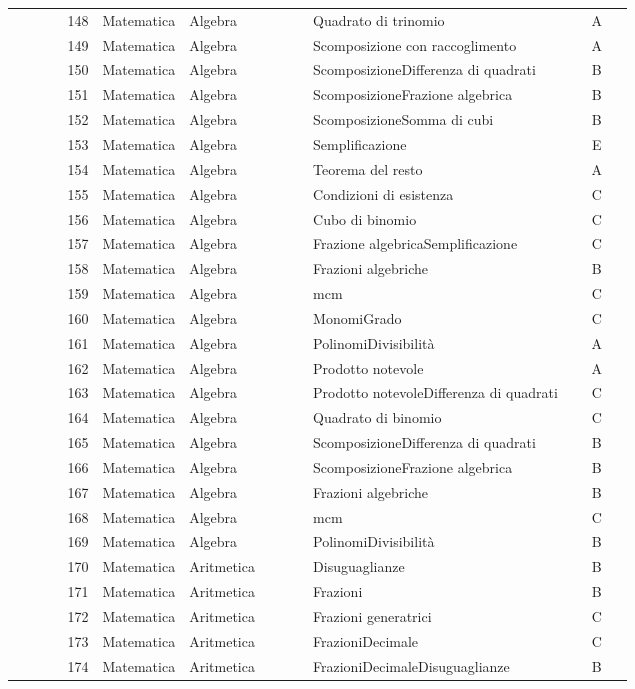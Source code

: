 \documentclass[20pt, a4paper]{article}
\begin{document}
\begin{longtable}{@{}r>{\raggedright\arraybackslash}p{0.14\linewidth}>{\raggedright\arraybackslash}p{0.20\linewidth}>{\raggedright\arraybackslash}p{0.42\linewidth}c@{}}
148 & Matematica & Algebra & Quadrato di trinomio & A \\
149 & Matematica & Algebra & Scomposizione con raccoglimento & A \\
150 & Matematica & Algebra & ScomposizioneDifferenza di quadrati & B \\
151 & Matematica & Algebra & ScomposizioneFrazione algebrica & B \\
152 & Matematica & Algebra & ScomposizioneSomma di cubi & B \\
153 & Matematica & Algebra & Semplificazione & E \\
154 & Matematica & Algebra & Teorema del resto & A \\
155 & Matematica & Algebra & Condizioni di esistenza & C \\
156 & Matematica & Algebra & Cubo di binomio & C \\
157 & Matematica & Algebra & Frazione algebricaSemplificazione & C \\
158 & Matematica & Algebra & Frazioni algebriche & B \\
159 & Matematica & Algebra & mcm & C \\
160 & Matematica & Algebra & MonomiGrado & C \\
161 & Matematica & Algebra & PolinomiDivisibilità & A \\
162 & Matematica & Algebra & Prodotto notevole & A \\
163 & Matematica & Algebra & Prodotto notevoleDifferenza di quadrati & C \\
164 & Matematica & Algebra & Quadrato di binomio & C \\
165 & Matematica & Algebra & ScomposizioneDifferenza di quadrati & B \\
166 & Matematica & Algebra & ScomposizioneFrazione algebrica & B \\
167 & Matematica & Algebra & Frazioni algebriche & B \\
168 & Matematica & Algebra & mcm & C \\
169 & Matematica & Algebra & PolinomiDivisibilità & B \\
170 & Matematica & Aritmetica & Disuguaglianze & B \\
171 & Matematica & Aritmetica & Frazioni & B \\
172 & Matematica & Aritmetica & Frazioni generatrici & C \\
173 & Matematica & Aritmetica & FrazioniDecimale & C \\
174 & Matematica & Aritmetica & FrazioniDecimaleDisuguaglianze & B \\

\end{longtable}
\end{document}
